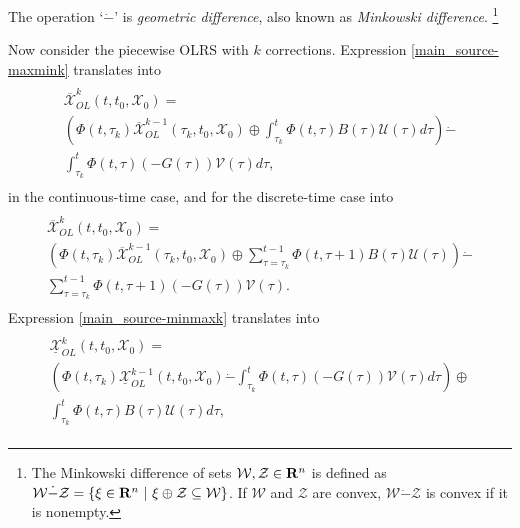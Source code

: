 \documentclass[letterpaper,10pt,english]{sphinxmanual}
\begin{document}
The operation ‘$\dot{-}$’ is \emph{geometric difference}, also known as
\emph{Minkowski difference}. \footnote{
The Minkowski difference of sets
${\mathcal W}, {\mathcal Z}\in{\bf R}^n$ is defined as
${\mathcal W}\dot{-}{\mathcal Z}= \left\{\xi\in{\bf R}^n ~|~
\xi \oplus {\mathcal Z}\subseteq {\mathcal W}\right\}$. If
${\mathcal W}$ and ${\mathcal Z}$ are convex,
${\mathcal W}\dot{-}{\mathcal Z}$ is convex if it is nonempty.
}

Now consider the piecewise OLRS with $k$ corrections. Expression
\eqref{main_source-maxmink} translates into
\label{main_source:equation-ctlsmaxmink}\begin{gather}
\begin{split}\begin{array}{l}
\overline{{\mathcal X}}_{OL}^k(t, t_0, {\mathcal X}_0) = \\
\left(\Phi(t, \tau_k)\overline{{\mathcal X}}_{OL}^{k-1}(\tau_k, t_0, {\mathcal X}_0) \oplus
\int_{\tau_k}^t\Phi(t, \tau)B(\tau){\mathcal U}(\tau)d\tau\right) \dot{-} \\
\int_{\tau_k}^t\Phi(t, \tau)(-G(\tau)){\mathcal V}(\tau)d\tau,
\end{array}\end{split}\label{main_source-ctlsmaxmink}
\end{gather}
in the continuous-time case, and for the discrete-time case into
\label{main_source:equation-dtlsmaxmink}\begin{gather}
\begin{split}\begin{array}{l}
\overline{{\mathcal X}}_{OL}^k(t, t_0, {\mathcal X}_0) = \\
\left(\Phi(t, \tau_k)\overline{{\mathcal X}}_{OL}^{k-1}(\tau_k, t_0, {\mathcal X}_0) \oplus
\sum_{\tau=\tau_k}^{t-1}\Phi(t, \tau+1)B(\tau){\mathcal U}(\tau)\right) \dot{-} \\
\sum_{\tau=\tau_k}^{t-1}\Phi(t, \tau+1)(-G(\tau)){\mathcal V}(\tau).
\end{array}\end{split}\label{main_source-dtlsmaxmink}
\end{gather}
Expression \eqref{main_source-minmaxk} translates into
\label{main_source:equation-ctlsminmaxk}\begin{gather}
\begin{split}\begin{array}{l}
\underline{{\mathcal X}}_{OL}^k(t, t_0, {\mathcal X}_0) = \\
\left(\Phi(t, \tau_k)\underline{{\mathcal X}}_{OL}^{k-1}(t, t_0, {\mathcal X}_0) \dot{-}
\int_{\tau_k}^t\Phi(t, \tau)(-G(\tau)){\mathcal V}(\tau)d\tau\right)
\oplus \\
\int_{\tau_k}^t\Phi(t, \tau)B(\tau){\mathcal U}(\tau)d\tau,
\end{array}\end{split}\label{main_source-ctlsminmaxk}
\end{gather}
\end{document}
